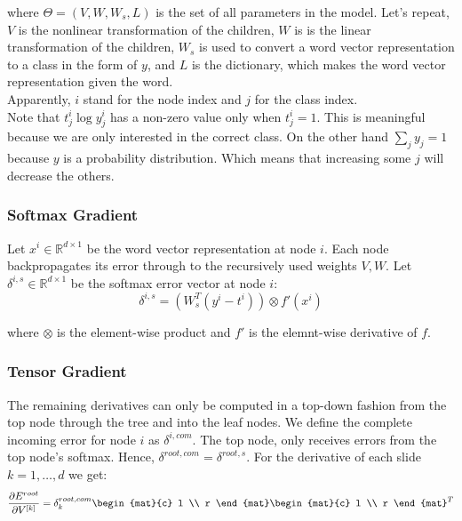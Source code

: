 where $\Theta = (V, W, W_s, L)$ is the set of all parameters in the model. Let's
repeat, $V$ is the nonlinear transformation of the children, $W$ is is the 
linear transformation of the children, $W_s$ is used to convert a word vector
representation to a class in the form of $y$, and $L$ is the dictionary, which
makes the word vector representation given the word.\\
Apparently, $i$ stand for the node index and $j$ for the class index.\\
Note that $t_j^i \log y_j^i$ has a non-zero value only when $t_j^i = 1$. This is
meaningful because we are only interested in the correct class. On the other
hand $\sum_j y_j = 1$ because $y$ is a probability distribution. Which means
that increasing some $j$ will decrease the others.\\

\subsubsection{Softmax Gradient}

Let $x^i \in \mathbb{R}^{d \times 1}$ be the word vector representation at 
node $i$. 
Each node backpropagates its error through to the recursively used weights $V,
W$. Let $\delta^{i, s} \in \mathbb{R}^{d \times 1}$ be the softmax error vector
at node $i$:
\begin{equation}
	\delta^{i, s} = \left( W_s^T (y^i - t^i) \right) \otimes f'(x^i)
\end{equation}

where $\otimes$ is the element-wise product and $f'$ is the elemnt-wise
derivative of $f$.

\subsubsection{Tensor Gradient}

The remaining derivatives can only be computed in a top-down fashion from the
top node through the tree and into the leaf nodes.
We define the complete incoming error for node $i$ as $\delta^{i, com}$.
The top node, only receives errors from the top node's softmax. Hence,
$\delta^{root, com} = \delta^{root, s}$.
For the derivative of each slide $k = 1, \dots, d$ we get:
\begin{equation}
	\frac{\partial E^{root}}{\partial V^{[k]}} = \delta^{root, com}_k
	\begin{mat}{c}
		l \\
		r
	\end{mat}
	\begin{mat}{c}
		l \\
		r
	\end{mat}^T
\end{equation}

